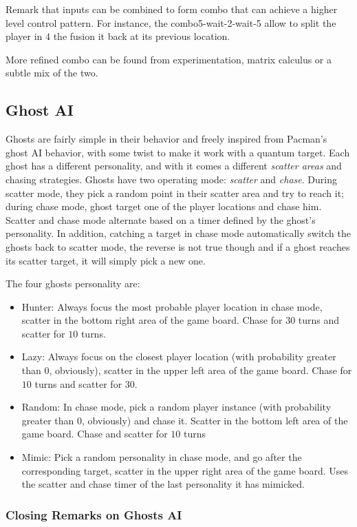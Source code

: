 \documentclass[a4paper]{article}
\begin{document}
Remark that inputs can be combined to form combo that can achieve a higher level control pattern. For instance, the combo5-{\sc wait}-2-{\sc wait}-5 allow to split the player in $4$ the fusion it back at its previous location.

More refined combo can be found from experimentation, matrix calculus or a subtle mix of the two.

\subsection{Ghost AI}

Ghosts are fairly simple in their behavior and freely inspired from Pacman’s ghost AI behavior, with some twist to make it work with a quantum target. Each ghost has a different personality, and with it comes a different \emph{scatter areas} and chasing strategies.
Ghosts have two operating mode: \emph{scatter} and \emph{chase}. During scatter mode, they pick a random point in their scatter area and try to reach it; during chase mode, ghost target one of the player locations and chase him. Scatter and chase mode alternate based on a timer defined by the ghost’s personality. In addition, catching a target in chase mode automatically switch the ghosts back to scatter mode, the reverse is not true though and if a ghost reaches its scatter target, it will simply pick a new one.

The four ghosts personality are:
\begin{itemize}
\item Hunter: Always focus the most probable player location in chase mode, scatter in the bottom right area of the game board. Chase for $30$ turns and scatter for $10$ turns.
\item Lazy: Always focus on the closest player location (with probability greater than $0$, obviously), scatter in the upper left area of the game board. Chase for $10$ turns and scatter for $30$.
\item Random: In chase mode, pick a random player instance (with probability greater than $0$, obviously) and chase it. Scatter in the bottom left area of the game board. Chase and scatter for $10$ turns
\item Mimic: Pick a random personality in chase mode, and go after the corresponding target, scatter in the upper right area of the game board. Uses the scatter and chase timer of the last personality it has mimicked. 
\end{itemize}

\subsubsection{Closing Remarks on Ghosts AI}
\end{document}
